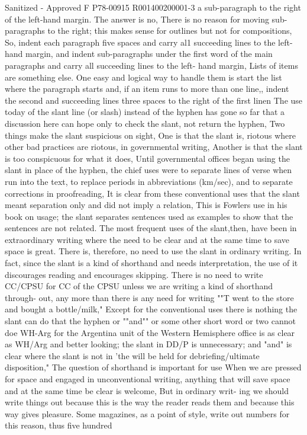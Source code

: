 \documentclass[
    oneside,
    11pt,
    draft
]{memoir}
\begin{document}
Sanitized - Approved F P78-00915 R001400200001-3 a sub-paragraph to the right of the left-hand margin. The answer is no, There is no reason for moving sub-paragraphs to the right; this makes sense for outlines but not for compositions, So, indent each paragraph five spaces and carry al1 succeeding lines to the left-hand margin, and indent sub-paragraphs under the first word of the main paragraphs and carry all succeeding lines to the left- hand margin, Lists of items are something else. One easy and logical way to handle them is start the list where the paragraph starts and, if an item runs to more than one line,, indent the second and succeeding lines three spaces to the right of the first linen The use today of the slant line (or slash) instead of the hyphen has gone so far that a discussion here can hope only to check the slant, not return the hyphen, Two things make the slant suspicious on sight, One is that the slant is, riotous where other bad practices are riotous, in governmental writing, Another is that the slant is too conspicuous for what it does, Until governmental offices began using the slant in place of the hyphen, the chief uses were to separate lines of verse when run into the text, to replace periods in abbreviations (km/sec), and to separate corrections in proofreading, It is clear from these conventional uses that the slant meant separation only and did not imply a relation, This is Fowlers use in his book on usage; the slant separates sentences used as examples to show that the sentences are not related. The most frequent uses of the slant,then, have been in extraordinary writing where the need to be clear and at the same time to save space is great. There is, therefore, no need to use the slant in ordinary writing. In fact, since the slant is a kind of shorthand and needs interpretation, the use of it discourages reading and encourages skipping. There is no need to write CC/CPSU for CC of the CPSU unless we are writing a kind of shorthand through- out, any more than there is any need for writing ""T went to the store and bought a bottle/milk," Except for the conventional uses there is nothing the slant can do that the hyphen or ""and"" or some other short word or two cannot doe WH-Arg for the Argentina unit of the Western Hemisphere office is as clear as WH/Arg and better looking; the slant in DD/P is unnecessary; and "and" is clear where the slant is not in 'the will be held for debriefing/ultimate disposition," The question of shorthand is important for use When we are pressed for space and engaged in unconventional writing, anything that will save space and at the same time be clear is welcome, But in ordinary writ- ing we should write things out because this is the way the reader reads them and because this way gives pleasure. Some magazines, as a point of style, write out numbers for this reason, thus five hundred
\end{document}
